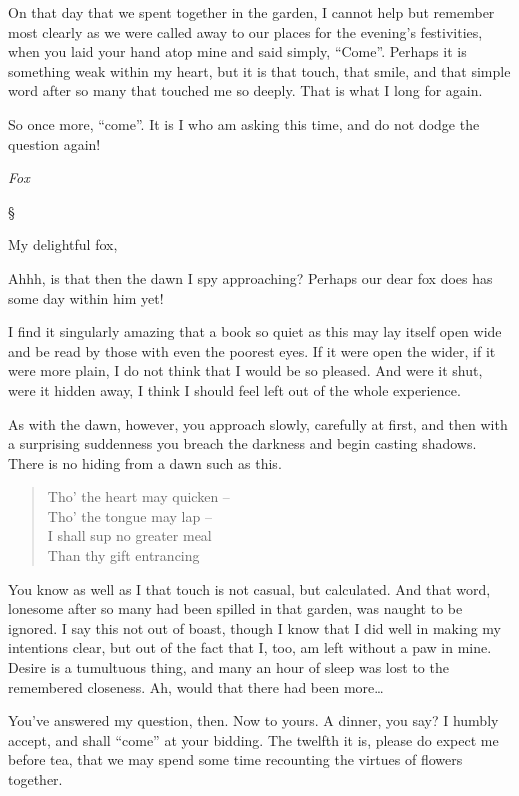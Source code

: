 \documentclass[12pt,letterpaper,oneside]{memoir}
\newcommand\secdiv{
  \begin{center}
    \S
  \end{center}
}
\begin{document}
  On that day that we spent together in the garden, I cannot help but
  remember most clearly as we were called away to our places for the
  evening's festivities, when you laid your hand atop mine and said
  simply, ``Come''. Perhaps it is something weak within my heart, but it
  is that touch, that smile, and that simple word after so many that
  touched me so deeply. That is what I long for again.

  So once more, ``come''. It is I who am asking this time, and do not
  dodge the question again!

  \emph{Fox}

  \secdiv

  My delightful fox,

  Ahhh, is that then the dawn I spy approaching? Perhaps our dear fox does
  has some day within him yet!

  I find it singularly amazing that a book so quiet as this may lay itself
  open wide and be read by those with even the poorest eyes. If it were
  open the wider, if it were more plain, I do not think that I would be so
  pleased. And were it shut, were it hidden away, I think I should feel
  left out of the whole experience.

  As with the dawn, however, you approach slowly, carefully at first, and
  then with a surprising suddenness you breach the darkness and begin
  casting shadows. There is no hiding from a dawn such as this.

  \begin{quote}
  Tho' the heart may quicken --\\
  Tho' the tongue may lap --\\
  I shall sup no greater meal\\
  Than thy gift entrancing
  \end{quote}

  You know as well as I that touch is not casual, but calculated. And that
  word, lonesome after so many had been spilled in that garden, was naught
  to be ignored. I say this not out of boast, though I know that I did
  well in making my intentions clear, but out of the fact that I, too, am
  left without a paw in mine. Desire is a tumultuous thing, and many an
  hour of sleep was lost to the remembered closeness. Ah, would that there
  had been more\ldots{}

  You've answered my question, then. Now to yours. A dinner, you say? I
  humbly accept, and shall ``come'' at your bidding. The twelfth it is,
  please do expect me before tea, that we may spend some time recounting
  the virtues of flowers together.
\end{document}
